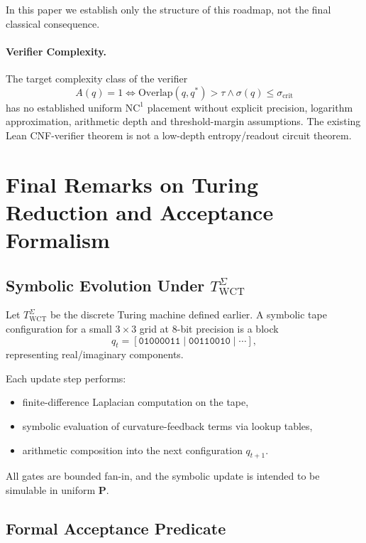 \documentclass[12pt]{article}
\theoremstyle{remark}
\begin{document}
In this paper we establish only the structure of this roadmap, not the final
classical consequence.

\paragraph{Verifier Complexity.}
The target complexity class of the verifier
\[
A(q)=1 \iff \mathrm{Overlap}(q,q^*) > \tau \wedge \sigma(q) \le \sigma_{\text{crit}}
\]
has no established uniform $\mathrm{NC}^1$
placement without explicit precision, logarithm
approximation, arithmetic depth and threshold-margin
assumptions.  The existing Lean CNF-verifier theorem
is not a low-depth entropy/readout circuit theorem.
    

\clearpage
\section{Final Remarks on Turing Reduction and Acceptance Formalism}

\subsection{Symbolic Evolution Under \(T^\Sigma_{\mathrm{WCT}}\)}

Let \(T^\Sigma_{\mathrm{WCT}}\) be the discrete Turing machine defined earlier.
A symbolic tape configuration for a small \(3\times 3\) grid at 8-bit precision
is a block
\[
q_t = 
[\texttt{01000011} \mid \texttt{00110010} \mid \cdots ],
\]
representing real/imaginary components.  

Each update step performs:
\begin{itemize}
    \item finite-difference Laplacian computation on the tape,
    \item symbolic evaluation of curvature-feedback terms via lookup tables,
    \item arithmetic composition into the next configuration \(q_{t+1}\).
\end{itemize}

All gates are bounded fan-in, and the symbolic update is intended to be
simulable in uniform \(\mathbf{P}\).

\subsection{Formal Acceptance Predicate}
\end{document}
